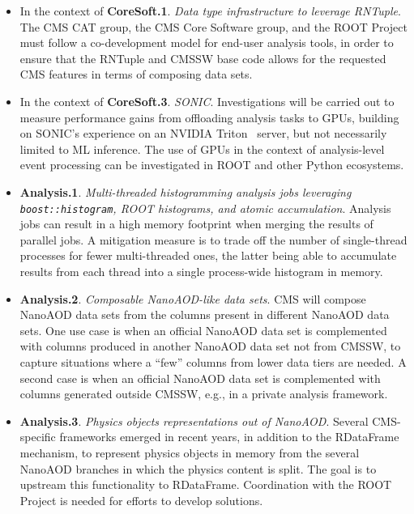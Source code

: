 \begin{itemize} %
\item {In the context of {\bf CoreSoft.1}}. {\em  Data type infrastructure to leverage RNTuple}. The CMS \gls{CAT} group, the CMS Core Software group, and the \textsc{ROOT} Project must follow a co-development model for end-user analysis tools, in order to ensure that the RNTuple and \gls{CMSSW} base code allows for the requested CMS features in terms of composing data sets.

\item {In the context of {\bf CoreSoft.3}}. {\em \gls{SONIC}}. Investigations will be carried out to measure performance gains from offloading analysis tasks to \glspl{GPU}, building on \gls{SONIC}’s experience on an NVIDIA Triton~\cite{triton} server, but not necessarily limited to \gls{ML} inference. The use of \glspl{GPU} in the context of analysis-level event processing can be investigated in \textsc{ROOT} and other Python ecosystems.

\item{\bf Analysis.1}. {\em Multi-threaded histogramming analysis jobs leveraging \texttt{boost::histogram}, \textsc{ROOT} histograms, and atomic accumulation}. Analysis jobs can result in a high memory footprint when merging the results of parallel jobs. A mitigation measure is to trade off the number of single-thread processes for fewer multi-threaded ones, the latter being able to accumulate results from each thread into a single process-wide histogram in memory. 

\item{\bf Analysis.2}. {\em Composable NanoAOD-like data sets}. CMS will compose NanoAOD data sets from the columns present in different NanoAOD data sets. One use case is when an official NanoAOD data set is complemented with columns produced in another NanoAOD data set not from \gls{CMSSW}, to capture situations where a ``few'' columns from lower data tiers are needed. A second case is when an official NanoAOD data set is complemented with columns generated outside \gls{CMSSW}, e.g., in a private analysis framework. 

\item{\bf Analysis.3}. {\em Physics objects representations out of NanoAOD}. Several CMS-specific frameworks emerged in recent years, in addition to the RDataFrame mechanism, to represent physics objects in memory from the several NanoAOD branches in which the physics content is split. The goal is to upstream this functionality to RDataFrame. Coordination with the \textsc{ROOT} Project is needed for \RunThree efforts to develop solutions.


\end{itemize}
